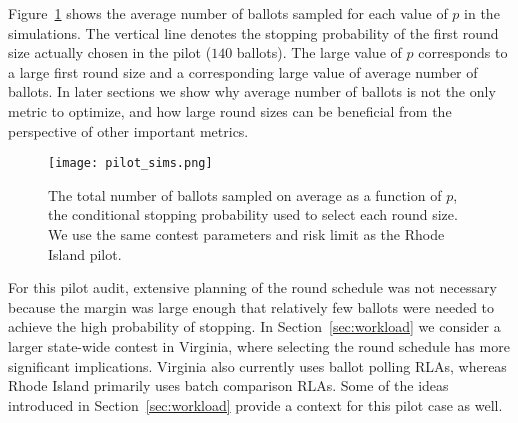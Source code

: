 Figure~\ref{fig:pilot_sims} shows the average number of ballots sampled for each value of $p$ in the simulations. The vertical line denotes the stopping probability of the first round size actually chosen in the pilot ($140$ ballots). The large value of $p$ corresponds to a large first round size and a corresponding large value of average number of ballots. In later sections we show why average number of ballots is not the only metric to optimize, and how large round sizes can be beneficial from the perspective of other important metrics. 

\begin{figure}[h!]
\texttt{[image: pilot\_sims.png]}
\caption{The total number of ballots sampled on average as a function of $p$, the conditional stopping probability used to select each round size. We use the same contest parameters and risk limit as the Rhode Island pilot.}
\label{fig:pilot_sims}
\end{figure}

For this pilot audit, extensive planning of the round schedule was not necessary because the margin was large enough that relatively few ballots were needed to achieve the high probability of stopping. In Section~\ref{sec:workload} we consider a larger state-wide contest in Virginia, where selecting the round schedule has more significant implications. Virginia also currently uses ballot polling RLAs, whereas Rhode Island primarily uses batch comparison RLAs. Some of the ideas introduced in Section~\ref{sec:workload} provide a context for this pilot case as well.

